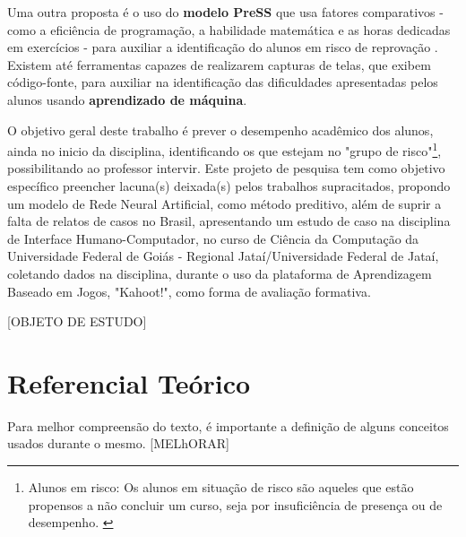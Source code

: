 \documentclass[
	12pt,				%
	openright,			%
	oneside,
	a4paper,			%
	english,			%
	french,				%
	spanish,			%
	brazil,				%
	]{abntex2}
\begin{document}
 Uma outra proposta é o uso do \textbf{modelo PreSS} que usa fatores comparativos - como a eficiência de programação, a habilidade matemática  e as horas dedicadas em exercícios - para auxiliar a identificação do alunos em risco de reprovação \cite{quille2018}. Existem até ferramentas capazes de realizarem capturas de telas, que exibem código-fonte, para auxiliar na identificação das dificuldades apresentadas pelos alunos usando \textbf{aprendizado de máquina}\cite{ahadi2016early}.
 
O objetivo geral deste trabalho é prever o desempenho acadêmico dos alunos, ainda no inicio da disciplina, identificando os que estejam no "grupo de risco"\footnote{Alunos em risco: Os alunos em situação de risco são aqueles que estão propensos a não concluir um curso, seja por insuficiência de presença ou de desempenho. \cite{da2014alunos}}, possibilitando ao professor intervir. Este projeto de pesquisa tem como objetivo específico preencher lacuna(s) deixada(s) pelos trabalhos supracitados, propondo um modelo de Rede Neural Artificial, como método preditivo, além de suprir a falta de relatos de casos no Brasil, apresentando um estudo de caso na disciplina de Interface Humano-Computador, no curso de Ciência da Computação da Universidade Federal de Goiás - Regional Jataí/Universidade Federal de Jataí, coletando dados na disciplina, durante o uso da plataforma de Aprendizagem Baseado em Jogos, "Kahoot!", como forma de avaliação formativa.

{\color{red}[OBJETO DE ESTUDO]}

\chapter{Referencial Teórico}
Para melhor compreensão do texto, é importante a definição de alguns conceitos usados durante o mesmo. {\color{red}[MELhORAR]}
\end{document}
